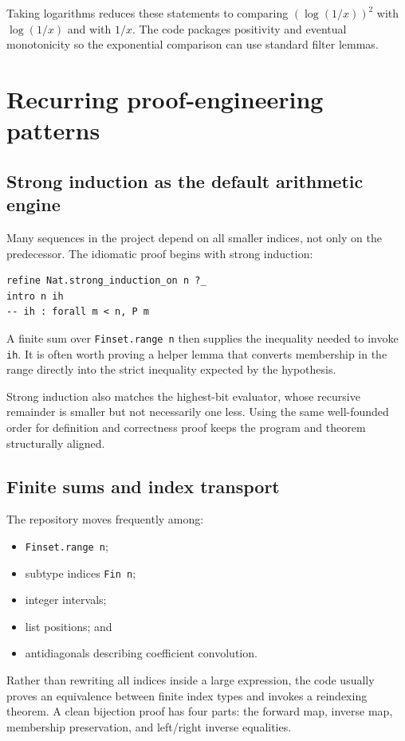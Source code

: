 \documentclass[11pt,oneside]{article}
\theoremstyle{definition}
\theoremstyle{remark}
\begin{document}
Taking logarithms reduces these statements to comparing \((\log(1/x))^2\) with \(\log(1/x)\) and with \(1/x\).  The code packages positivity and eventual monotonicity so the exponential comparison can use standard filter lemmas.

\section{Recurring proof-engineering patterns}\label{ch:engineering}

\subsection{Strong induction as the default arithmetic engine}
Many sequences in the project depend on all smaller indices, not only on the predecessor.  The idiomatic proof begins with strong induction:
\begin{lstlisting}[style=pseudo]
refine Nat.strong_induction_on n ?_
intro n ih
-- ih : forall m < n, P m
\end{lstlisting}
A finite sum over \nolinkurl{Finset.range n} then supplies the inequality needed to invoke \nolinkurl{ih}.  It is often worth proving a helper lemma that converts membership in the range directly into the strict inequality expected by the hypothesis.

Strong induction also matches the highest-bit evaluator, whose recursive remainder is smaller but not necessarily one less.  Using the same well-founded order for definition and correctness proof keeps the program and theorem structurally aligned.

\subsection{Finite sums and index transport}
The repository moves frequently among:
\begin{itemize}
  \item \nolinkurl{Finset.range n};
  \item subtype indices \nolinkurl{Fin n};
  \item integer intervals;
  \item list positions; and
  \item antidiagonals describing coefficient convolution.
\end{itemize}
Rather than rewriting all indices inside a large expression, the code usually proves an equivalence between finite index types and invokes a reindexing theorem.  A clean bijection proof has four parts: the forward map, inverse map, membership preservation, and left/right inverse equalities.
\end{document}
